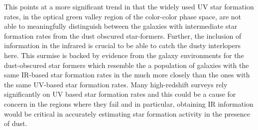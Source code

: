  This points at a more significant trend in that the widely used UV star formation rates, in the optical green valley region of the color-color phase space, are not able to meaningfully distinguish between the galaxies with intermediate star formation rates from the dust obscured star-formers. Further, the inclusion of information in the infrared is crucial to be able to catch the dusty interlopers here. This surmise is backed by evidence from the galaxy environments for the dust-obscured star formers which resemble the a population of galaxies with the same IR-based star formation rates in the much more closely than the ones with the same UV-based star formation rates. Many high-redshift surveys rely significantly on UV based star formation rates and this could be a cause for concern in the regions where they fail and in particular, obtaining IR information would be critical in accurately estimating star formation activity in the presence of dust.\\
 
 
 
 
 